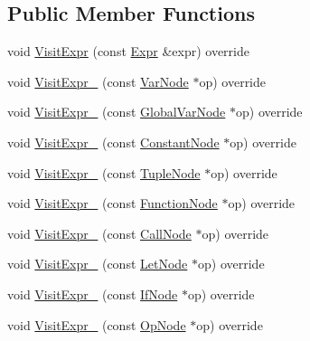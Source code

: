 \subsection*{Public Member Functions}
\begin{DoxyCompactItemize}
\item 
void \hyperlink{classtvm_1_1relay_1_1ExprVisitor_a4f3e1694dd33f3cbe1ae8d933de6f181}{Visit\+Expr} (const \hyperlink{namespacetvm_1_1relay_a5b84e3790f89bb3fad5c7911eeb99531}{Expr} \&expr) override
\item 
void \hyperlink{classtvm_1_1relay_1_1ExprVisitor_a4e019eac736a8cad9c3effededbf5a15}{Visit\+Expr\+\_\+} (const \hyperlink{classtvm_1_1relay_1_1VarNode}{Var\+Node} $\ast$op) override
\item 
void \hyperlink{classtvm_1_1relay_1_1ExprVisitor_a0b12fa32cf9c1a6d617f03e21dcb429e}{Visit\+Expr\+\_\+} (const \hyperlink{namespacetvm_1_1relay_afe7144195dbbc914183189444ef6a347}{Global\+Var\+Node} $\ast$op) override
\item 
void \hyperlink{classtvm_1_1relay_1_1ExprVisitor_a0b5a349c65dfc3f7271459a7d1f25518}{Visit\+Expr\+\_\+} (const \hyperlink{classtvm_1_1relay_1_1ConstantNode}{Constant\+Node} $\ast$op) override
\item 
void \hyperlink{classtvm_1_1relay_1_1ExprVisitor_a32944ecc47f7d8cfaf34b3044a934f99}{Visit\+Expr\+\_\+} (const \hyperlink{classtvm_1_1relay_1_1TupleNode}{Tuple\+Node} $\ast$op) override
\item 
void \hyperlink{classtvm_1_1relay_1_1ExprVisitor_a0e93c7cb8e57dfcf332023f17779086b}{Visit\+Expr\+\_\+} (const \hyperlink{classtvm_1_1relay_1_1FunctionNode}{Function\+Node} $\ast$op) override
\item 
void \hyperlink{classtvm_1_1relay_1_1ExprVisitor_a823064b9583097958d53dd41a9d15be8}{Visit\+Expr\+\_\+} (const \hyperlink{classtvm_1_1relay_1_1CallNode}{Call\+Node} $\ast$op) override
\item 
void \hyperlink{classtvm_1_1relay_1_1ExprVisitor_af31cf8bd7db777ac3a521f5ea12ddd00}{Visit\+Expr\+\_\+} (const \hyperlink{classtvm_1_1relay_1_1LetNode}{Let\+Node} $\ast$op) override
\item 
void \hyperlink{classtvm_1_1relay_1_1ExprVisitor_a2bcd0d66b18c47332d4b95b2122e55b3}{Visit\+Expr\+\_\+} (const \hyperlink{classtvm_1_1relay_1_1IfNode}{If\+Node} $\ast$op) override
\item 
void \hyperlink{classtvm_1_1relay_1_1ExprVisitor_ad906cf488b87cc034c13486f32223386}{Visit\+Expr\+\_\+} (const \hyperlink{namespacetvm_1_1relay_ac9d4f2cf78a48659817a88d890e1d142}{Op\+Node} $\ast$op) override

\end{DoxyCompactItemize}
